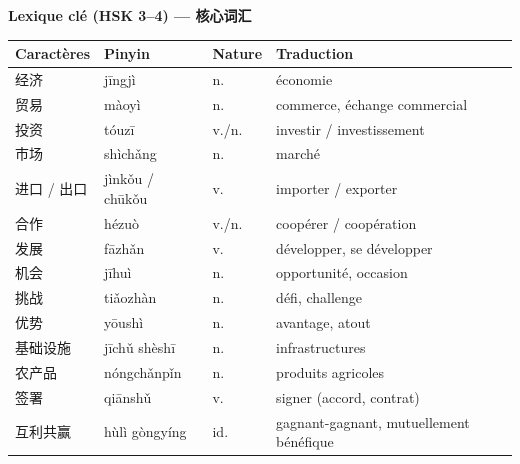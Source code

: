 \documentclass[11pt]{article}
\begin{document}
\begin{bilan}

\textbf{Lexique clé (HSK 3--4) — 核心词汇}
\begin{center}
\begin{tabularx}{\linewidth}{|X|X|X|X|}
\hline
\rowcolor{popblueL} \textbf{Caractères} & \textbf{Pinyin} & \textbf{Nature} & \textbf{Traduction} \\ \hline
经济 & jīngjì & n. & économie \\ \hline
贸易 & màoyì & n. & commerce, échange commercial \\ \hline
投资 & tóuzī & v./n. & investir / investissement \\ \hline
市场 & shìchǎng & n. & marché \\ \hline
进口 / 出口 & jìnkǒu / chūkǒu & v. & importer / exporter \\ \hline
合作 & hézuò & v./n. & coopérer / coopération \\ \hline
发展 & fāzhǎn & v. & développer, se développer \\ \hline
机会 & jīhuì & n. & opportunité, occasion \\ \hline
挑战 & tiǎozhàn & n. & défi, challenge \\ \hline
优势 & yōushì & n. & avantage, atout \\ \hline
基础设施 & jīchǔ shèshī & n. & infrastructures \\ \hline
农产品 & nóngchǎnpǐn & n. & produits agricoles \\ \hline
签署 & qiānshǔ & v. & signer (accord, contrat) \\ \hline
互利共赢 & hùlì gòngyíng & id. & gagnant-gagnant, mutuellement bénéfique \\ \hline
\end{tabularx}
\end{center}


\end{bilan}
\end{document}
